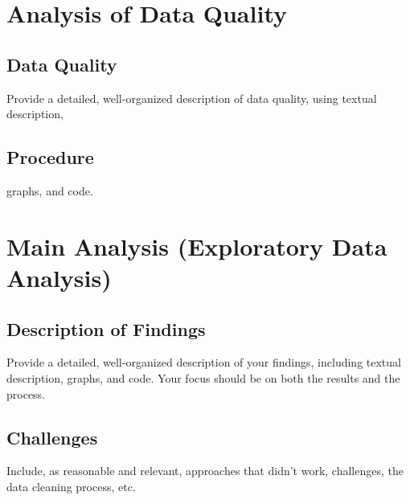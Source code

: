 \documentclass[11pt,fleqn]{book} %
\begin{document}

\chapter{Analysis of Data Quality}

\section{Data Quality}

\vspace{1em}
Provide a detailed, well-organized description of data quality, using textual description, 

\section{Procedure}

\vspace{1em}
graphs, and code.




\chapter{Main Analysis (Exploratory Data Analysis)}

\section{Description of Findings}

\vspace{1em}
Provide a detailed, well-organized description of your findings, including textual description, graphs, and code.  Your focus should be on both the results and the process. 



\section{Challenges}

\vspace{1em}
Include, as reasonable and relevant, approaches that didn't work, challenges, the data cleaning process, etc.
\end{document}
